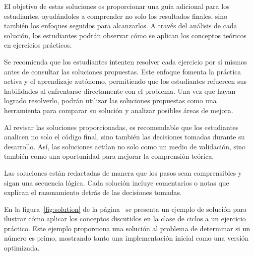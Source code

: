 El objetivo de estas soluciones es proporcionar una guía adicional para los estudiantes, ayudándoles a comprender no solo los resultados finales, sino también los enfoques seguidos para alcanzarlos. A través del análisis de cada solución, los estudiantes podrán observar cómo se aplican los conceptos teóricos en ejercicios prácticos.

Se recomienda que los estudiantes intenten resolver cada ejercicio por sí mismos antes de consultar las soluciones propuestas. Este enfoque fomenta la práctica activa y el aprendizaje autónomo, permitiendo que los estudiantes refuercen sus habilidades al enfrentarse directamente con el problema. Una vez que hayan logrado resolverlo, podrán utilizar las soluciones propuestas como una herramienta para comparar su solución y analizar posibles áreas de mejora.

Al revisar las soluciones proporcionadas, es recomendable que los estudiantes analicen no solo el código final, sino también las decisiones tomadas durante su desarrollo. Así, las soluciones actúan no solo como un medio de validación, sino también como una oportunidad para mejorar la comprensión teórica.

Las soluciones están redactadas de manera que los pasos sean comprensibles y sigan una secuencia lógica. Cada solución incluye comentarios o notas que explican el razonamiento detrás de las decisiones tomadas.

En la figura~\ref{fig:solution} de la página~\pageref{fig:solution} se presenta un ejemplo de solución para ilustrar cómo aplicar los conceptos discutidos en la clase de ciclos a un ejercicio práctico. Este ejemplo proporciona una solución al problema de determinar si un número es primo, mostrando tanto una implementación inicial como una versión optimizada.

